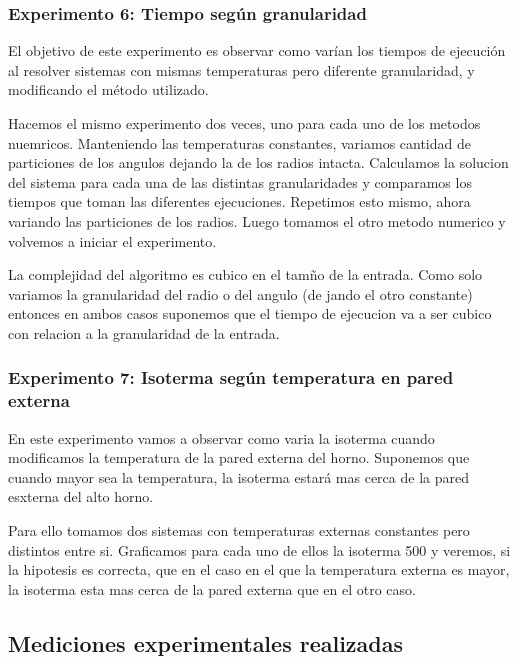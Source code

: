   	\subsubsection*{Experimento 6: Tiempo según granularidad}
  	El objetivo de este experimento es observar como varían los tiempos de ejecución al resolver sistemas con mismas temperaturas pero diferente granularidad, y modificando el método utilizado.
  	
    Hacemos el mismo experimento dos veces, uno para cada uno de los metodos nuemricos. Manteniendo las temperaturas constantes, variamos cantidad de particiones de los angulos dejando la de los radios intacta. Calculamos la solucion del sistema para cada una de las distintas granularidades y comparamos los tiempos que toman las diferentes ejecuciones. Repetimos esto mismo, ahora variando las particiones de los radios. Luego tomamos el otro metodo numerico y volvemos a iniciar el experimento. 

  	La complejidad del algoritmo es cubico en el tamño de la entrada. Como solo variamos la granularidad del radio o del angulo (de jando el otro constante) entonces en ambos casos suponemos que el tiempo de ejecucion va a ser cubico con relacion a la granularidad de la entrada.


    \subsubsection*{Experimento 7: Isoterma según temperatura en pared externa}
    En este experimento vamos a observar como varia la isoterma cuando modificamos la temperatura de la pared externa del horno.
    Suponemos que cuando mayor sea la temperatura, la isoterma estará mas cerca de la pared esxterna del alto horno. 


    Para ello tomamos dos sistemas con temperaturas externas constantes pero distintos entre si. Graficamos para cada uno de ellos la isoterma 500 y veremos, si la hipotesis es correcta, que en el caso en el que la temperatura externa es mayor, la isoterma esta mas cerca de la pared externa que en el otro caso. 

  \subsection{Mediciones experimentales realizadas}
